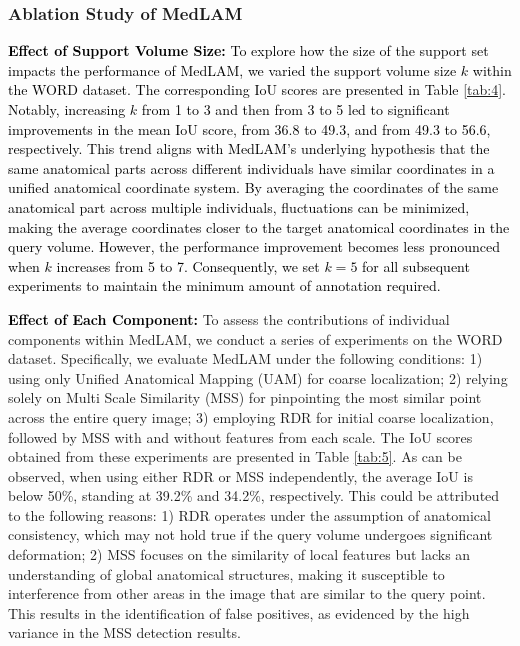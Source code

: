\documentclass[times,twocolumn,final]{elsarticle}
\begin{document}
\subsubsection{Ablation Study of MedLAM}
\label{sec:4.4.2}
\textcolor{black}{\textbf{Effect of Support Volume Size:}
To explore how the size of the support set impacts the performance of MedLAM, we varied the support volume size $k$ within the WORD dataset. The corresponding IoU scores are presented in Table \ref{tab:4}. Notably, increasing $k$ from 1 to 3 and then from 3 to 5 led to significant improvements in the mean IoU score, from 36.8 to 49.3, and from 49.3 to 56.6, respectively. This trend aligns with MedLAM's underlying hypothesis that the same anatomical parts across different individuals have similar coordinates in a unified anatomical coordinate system. By averaging the coordinates of the same anatomical part across multiple individuals, fluctuations can be minimized, making the average coordinates closer to the target anatomical coordinates in the query volume. However, the performance improvement becomes less pronounced when $k$ increases from 5 to 7. Consequently, we set $k=5$ for all subsequent experiments to maintain the minimum amount of annotation required.}
\par
\textcolor{black}{\textbf{Effect of Each Component:}}
To assess the contributions of individual components within MedLAM, we conduct a series of experiments on the WORD dataset. Specifically, we evaluate MedLAM under the following conditions: 1) using only Unified Anatomical Mapping (UAM) for coarse localization; 2) relying solely on Multi Scale Similarity (MSS) for pinpointing the most similar point across the entire query image; 3) employing RDR for initial coarse localization, followed by MSS with and without features from each scale. The IoU scores obtained from these experiments are presented in Table \ref{tab:5}. As can be observed, when using either RDR or MSS independently, the average IoU is below 50\%, standing at 39.2\% and 34.2\%, respectively. This could be attributed to the following reasons: 1) RDR operates under the assumption of anatomical consistency, which may not hold true if the query volume undergoes significant deformation; 2) MSS focuses on the similarity of local features but lacks an understanding of global anatomical structures, making it susceptible to interference from other areas in the image that are similar to the query point. This results in the identification of false positives, as evidenced by the high variance in the MSS detection results.
\end{document}

